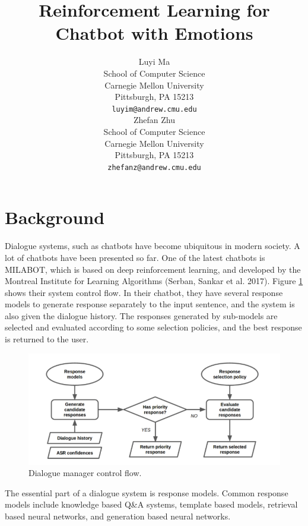 \documentclass{article}
\title{Reinforcement Learning for Chatbot with Emotions}
\author{
  Luyi Ma \\
  School of Computer Science\\
  Carnegie Mellon University\\
  Pittsburgh, PA 15213 \\
  \texttt{luyim@andrew.cmu.edu} \\
  \And
  Zhefan Zhu \\
  School of Computer Science \\
  Carnegie Mellon University\\
  Pittsburgh, PA 15213 \\
  \texttt{zhefanz@andrew.cmu.edu} \\  
}
\begin{document}

\maketitle






\section{Background}

Dialogue systems, such as chatbots have become ubiquitous in modern society. A lot of chatbots have been presented so far. One of the latest chatbots is MILABOT, which is based on deep reinforcement learning, and developed by the Montreal Institute for Learning Algorithms (Serban, Sankar et al. 2017). Figure \ref{fig:dialoguesystem} shows their system control flow. In their chatbot, they have several response models to generate response separately to the input sentence, and the system is also given the dialogue history. The responses generated by sub-models are selected and evaluated according to some selection policies, and the best response is returned to the user. \par 





\begin{figure}[!h]
\begin{center}
\includegraphics[scale=0.4]{figure1.png}
\caption{Dialogue manager control flow.}
\label{fig:dialoguesystem}
\end{center}
\end{figure}


The essential part of a dialogue system is response models. Common response models include knowledge based Q\&A systems, template based models, retrieval based neural networks, and generation based neural networks. \par
\end{document}
